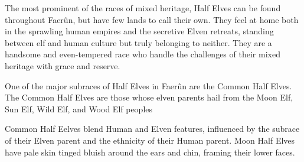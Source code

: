 
The most prominent of the races of mixed heritage, Half Elves can be found throughout Faerûn, but have few lands to call their own. They feel at home both in the sprawling human empires and the secretive Elven retreats, standing between elf and human culture but truly belonging to neither. They are a handsome and even-tempered race who handle the challenges of their mixed heritage with grace and reserve.

One of the major subraces of Half Elves in Faerûn are the Common Half Elves. The Common Half Elves are those whose elven parents hail from the Moon Elf, Sun Elf, Wild Elf, and Wood Elf peoples

Common Half Eelves blend Human and Elven features, influenced by the subrace of their Elven parent and the ethnicity of their Human parent. Moon Half Elves have pale skin tinged bluish around the ears and chin, framing their lower faces.

